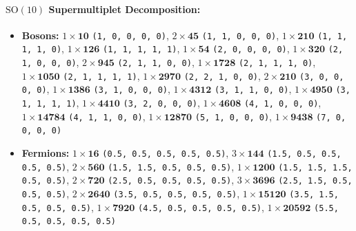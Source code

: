 \documentclass[11pt,a4paper]{article}
\begin{document}
\paragraph{$\mathrm{SO}(10)$ Supermultiplet Decomposition:}
\begin{itemize}
    \item \textbf{Bosons:} $1 \times \mathbf{10}$ \texttt{(1, 0, 0, 0, 0)}, $2 \times \mathbf{45}$ \texttt{(1, 1, 0, 0, 0)}, $1 \times \mathbf{210}$ \texttt{(1, 1, 1, 1, 0)}, $1 \times \mathbf{126}$ \texttt{(1, 1, 1, 1, 1)}, $1 \times \mathbf{54}$ \texttt{(2, 0, 0, 0, 0)}, $1 \times \mathbf{320}$ \texttt{(2, 1, 0, 0, 0)}, $2 \times \mathbf{945}$ \texttt{(2, 1, 1, 0, 0)}, $1 \times \mathbf{1728}$ \texttt{(2, 1, 1, 1, 0)}, $1 \times \mathbf{1050}$ \texttt{(2, 1, 1, 1, 1)}, $1 \times \mathbf{2970}$ \texttt{(2, 2, 1, 0, 0)}, $2 \times \mathbf{210}$ \texttt{(3, 0, 0, 0, 0)}, $1 \times \mathbf{1386}$ \texttt{(3, 1, 0, 0, 0)}, $1 \times \mathbf{4312}$ \texttt{(3, 1, 1, 0, 0)}, $1 \times \mathbf{4950}$ \texttt{(3, 1, 1, 1, 1)}, $1 \times \mathbf{4410}$ \texttt{(3, 2, 0, 0, 0)}, $1 \times \mathbf{4608}$ \texttt{(4, 1, 0, 0, 0)}, $1 \times \mathbf{14784}$ \texttt{(4, 1, 1, 0, 0)}, $1 \times \mathbf{12870}$ \texttt{(5, 1, 0, 0, 0)}, $1 \times \mathbf{9438}$ \texttt{(7, 0, 0, 0, 0)}
    \item \textbf{Fermions:} $1 \times \mathbf{16}$ \texttt{(0.5, 0.5, 0.5, 0.5, 0.5)}, $3 \times \mathbf{144}$ \texttt{(1.5, 0.5, 0.5, 0.5, 0.5)}, $2 \times \mathbf{560}$ \texttt{(1.5, 1.5, 0.5, 0.5, 0.5)}, $1 \times \mathbf{1200}$ \texttt{(1.5, 1.5, 1.5, 0.5, 0.5)}, $2 \times \mathbf{720}$ \texttt{(2.5, 0.5, 0.5, 0.5, 0.5)}, $3 \times \mathbf{3696}$ \texttt{(2.5, 1.5, 0.5, 0.5, 0.5)}, $2 \times \mathbf{2640}$ \texttt{(3.5, 0.5, 0.5, 0.5, 0.5)}, $1 \times \mathbf{15120}$ \texttt{(3.5, 1.5, 0.5, 0.5, 0.5)}, $1 \times \mathbf{7920}$ \texttt{(4.5, 0.5, 0.5, 0.5, 0.5)}, $1 \times \mathbf{20592}$ \texttt{(5.5, 0.5, 0.5, 0.5, 0.5)}
\end{itemize}
\end{document}

